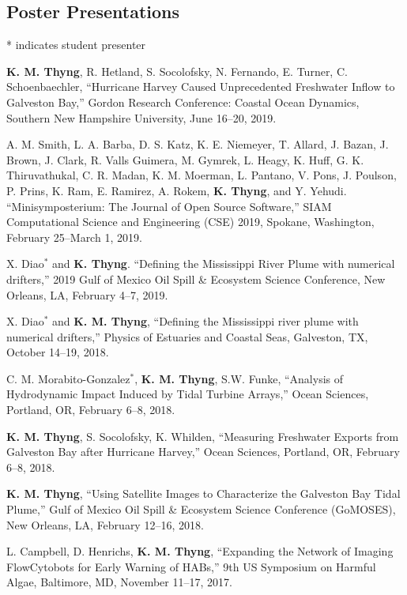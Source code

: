 \documentclass[10pt,letterpaper]{article}
\newcommand{\kmt}{\textbf{K. M. Thyng}}
\newcommand{\kt}{\textbf{K. Thyng}}
\renewenvironment{itemize}{
  \begin{list}{}{
    \setlength{\leftmargin}{1.5em}
    \setlength{\itemsep}{0.25em}
    \setlength{\parskip}{0pt}
    \setlength{\parsep}{0.25em}
  }
}{
  \end{list}
}
\begin{document}
\subsection*{Poster Presentations}
* indicates student presenter
\begin{itemize}

\item \kmt, R. Hetland, S. Socolofsky, N. Fernando, E. Turner, C. Schoenbaechler, ``Hurricane Harvey Caused Unprecedented Freshwater Inflow to Galveston Bay,'' Gordon Research Conference: Coastal Ocean Dynamics, Southern New Hampshire University, June 16--20, 2019.

\item A. M. Smith, L. A. Barba, D. S. Katz, K. E. Niemeyer, T. Allard, J. Bazan, J. Brown, J. Clark, R. Valls Guimera, M. Gymrek, L. Heagy, K. Huff, G. K. Thiruvathukal, C. R. Madan, K. M. Moerman, L. Pantano, V. Pons, J. Poulson, P. Prins, K. Ram, E. Ramirez, A. Rokem, \kt, and Y. Yehudi. ``Minisymposterium: The Journal of Open Source Software,'' SIAM Computational Science and Engineering (CSE) 2019, Spokane, Washington, February 25--March 1, 2019.

\item X. Diao$^*$ and \kt. ``Defining the Mississippi River Plume with numerical drifters,'' 2019 Gulf of Mexico Oil Spill \& Ecosystem Science Conference, New Orleans, LA, February 4--7, 2019.

\item X. Diao$^*$ and \kmt, ``Defining the Mississippi river plume with numerical drifters,'' Physics of Estuaries and Coastal Seas, Galveston, TX, October 14--19, 2018.

\item C. M. Morabito-Gonzalez$^*$, \kmt, S.W. Funke, ``Analysis of Hydrodynamic Impact Induced by Tidal Turbine Arrays,'' Ocean Sciences, Portland, OR, February 6--8, 2018.

\item \kmt, S. Socolofsky, K. Whilden, ``Measuring Freshwater Exports from Galveston Bay after Hurricane Harvey,'' Ocean Sciences, Portland, OR, February 6--8, 2018.

\item \kmt, ``Using Satellite Images to Characterize the Galveston Bay Tidal Plume,'' Gulf of Mexico Oil Spill \& Ecosystem Science Conference (GoMOSES), New Orleans, LA, February 12--16, 2018.

\item L. Campbell, D. Henrichs, \kmt, ``Expanding the Network of Imaging FlowCytobots for Early Warning of HABs,'' 9th US Symposium on Harmful Algae, Baltimore, MD, November 11--17, 2017.


\end{itemize}
\end{document}

